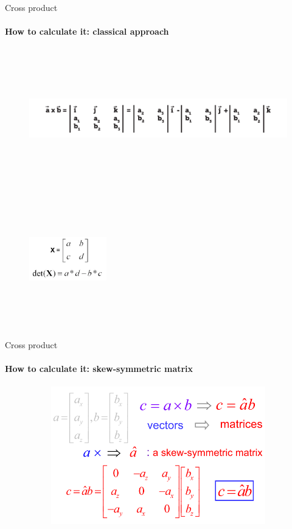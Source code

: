 \documentclass[aspectratio=169,xcolor=table,10pt, notes=hide]{beamer}
\begin{document}
    \begin{frame}[t]{Cross product}
    \framesubtitle{How to calculate it: classical approach}
        \begin{figure}[H]
            \centering\includegraphics[height=6cm,width=1\textwidth,keepaspectratio]{image40.png}
            \label{fig:image40}
            \includegraphics[height=6cm,width=0.3\textwidth,keepaspectratio]{image24.png}
            \label{fig:image24}
        \end{figure}
    \end{frame}
    
    \begin{frame}[t]{Cross product}
    \framesubtitle{How to calculate it: skew-symmetric matrix}
        \begin{figure}[H]
            \centering\includegraphics[height=6cm,width=1\textwidth,keepaspectratio]{image26.png}
            \label{fig:image26}
        \end{figure}
    \end{frame}
    
\end{document}
